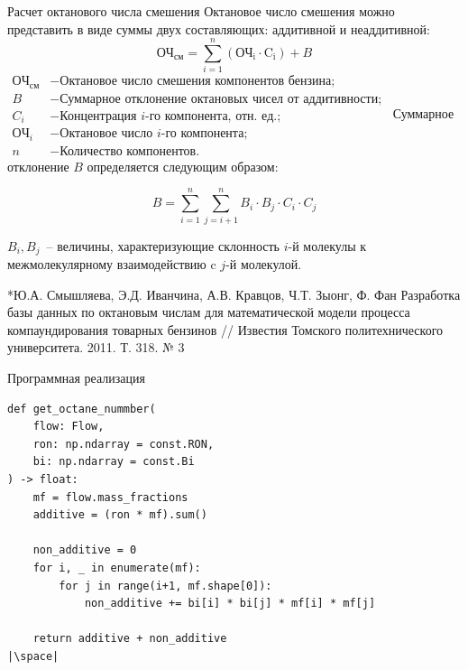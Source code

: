 \documentclass[aspectratio=169, mathserif]{beamer}%
\begin{document}
\begin{frame}[fragile, label=c]{Расчет октанового числа смешения}
\scriptsize
Октановое число смешения можно представить в виде суммы двух составляющих: аддитивной и неаддитивной:
\vfill
\begin{equation}
	\mathrm{ОЧ}_{\mathrm{см}} = \sum \limits _{i=1} ^{n} \left(\mathrm{ОЧ_{i} \cdot C_{i}}\right) + B
\end{equation}
\vfill
$
\begin{aligned}
\mathrm{ОЧ}_{\mathrm{см}} &- \text{Октановое число смешения компонентов бензина}; \\
B &- \text{Суммарное отклонение октановых чисел от аддитивности}; \\
C_i &- \text{Концентрация $i$-го компонента, отн. ед.}; \\
\mathrm{ОЧ}_i &- \text{Октановое число $i$-го компонента}; \\
n &- \text{Количество компонентов}.
\end{aligned}
$
\vfill
Суммарное отклонение $B$ определяется следующим образом:
\vfill
\begin{minipage}{.35\textwidth}
\begin{equation}
	B = \sum \limits _{i=1} ^{n} \sum \limits _{j=i+1} ^{n} B_i \cdot B_j \cdot C_i \cdot C_j
\end{equation}
\vfill
\end{minipage}
\begin{minipage}{.04\textwidth}
\hfill
\end{minipage}
\begin{minipage}{.6\textwidth}
$B_i, B_j$~-- величины, характеризующие склонность $i$-й молекулы к межмолекулярному взаимодействию c $j$-й молекулой.
\end{minipage}
\vfill
\tiny{*Ю.А. Смышляева, Э.Д. Иванчина, А.В. Кравцов, Ч.Т. Зыонг, Ф. Фан Разработка базы данных по октановым числам для математической модели процесса компаундирования товарных бензинов // Известия Томского политехнического университета. 2011. Т. 318. № 3}
\vfill
\end{frame}


\begin{frame}[fragile, label=c]{Программная реализация}
\scriptsize
\begin{verbatim}
def get_octane_nummber(
    flow: Flow,
    ron: np.ndarray = const.RON,
    bi: np.ndarray = const.Bi
) -> float:
    mf = flow.mass_fractions
    additive = (ron * mf).sum()

    non_additive = 0
    for i, _ in enumerate(mf):
        for j in range(i+1, mf.shape[0]):
            non_additive += bi[i] * bi[j] * mf[i] * mf[j]

    return additive + non_additive
|\space|
\end{verbatim}
\vfill
\end{frame}
\end{document}
